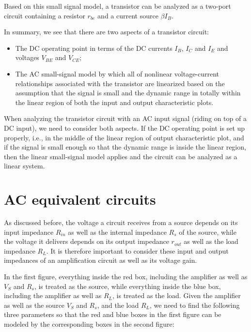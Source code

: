 \documentclass{article}
\begin{document}
Based on this small signal model, a transistor can be analyzed as a 
two-port circuit containing a resistor $r_{be}$ and a current source 
$\beta I_B$.

In summary, we see that there are two aspects of a transistor circuit:
\begin{itemize}
\item The DC operating point in terms of the DC currents $I_B$, $I_C$ 
  and $I_E$ and voltages $V_{BE}$ and $V_{CE}$;
\item The AC small-signal model by which all of nonlinear voltage-current 
  relationships associated with the transistor are linearized based 
  on the assumption that the signal is small and the dynamic range 
  in totally within the linear region of both the input and output
  characteristic plots. 
\end{itemize}
When analyzing the transistor circuit with an AC input signal (riding 
on top of a DC input), we need to consider both aspects. If the DC 
operating point is set up properly, i.e., in the middle of the linear
region of output characteristic plot, and if the signal is small enough 
so that the dynamic range is inside the linear region, then the linear 
small-signal model applies and the circuit can be analyzed as a linear 
system.


\section*{AC equivalent circuits}

As discussed before, the voltage a circuit receives from a source 
depends on its input impedance $R_{in}$ as well as the internal 
impedance $R_s$ of the source, while the voltage it delivers depends
on its output impedance $r_{out}$ as well as the load impedance $R_L$.
It is therefore important to consider these input and output impedances
of an amplification circuit as well as its voltage gain.


In the first figure, everything inside the red box, including the 
amplifier as well as $V_S$ and $R_s$, is treated as the source, while 
everything inside the blue box, including the amplifier as well as $R_L$,
is treated as the load. Given the amplifier as well as the source $V_S$ 
and $R_s$, and the load $R_L$, we need to find the following three
parameters so that the red and blue boxes in the first figure can be
modeled by the corresponding boxes in the second figure:
\end{document}
